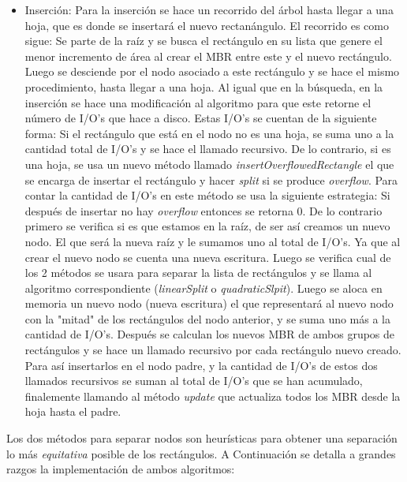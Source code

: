 \documentclass[letterpaper,12pt]{article}
\begin{document}
\begin{itemize}
\item Inserci\'on: Para la inserci\'on se hace un recorrido del \'arbol hasta llegar a una hoja, que es donde se insertar\'a el nuevo rectan\'angulo. El recorrido es como sigue: Se parte de la ra\'iz y se busca el rect\'angulo en su lista que genere el menor incremento de \'area al crear el MBR entre este y el nuevo rect\'angulo. Luego se desciende por el nodo asociado a este rect\'angulo y se hace el mismo procedimiento, hasta llegar a una hoja. Al igual que en la b\'usqueda, en la inserci\'on se hace una modificaci\'on al algoritmo para que este retorne el n\'umero de I/O's que hace a disco. Estas I/O's se cuentan de la siguiente forma: Si el rect\'angulo que est\'a en el nodo no es una hoja, se suma uno a la cantidad total de I/O's y se hace el llamado recursivo. De lo contrario, si es una hoja, se usa un nuevo m\'etodo llamado \textit{insertOverflowedRectangle} el que se encarga de insertar el rect\'angulo y hacer \textit{split} si se produce \textit{overflow}. Para contar la cantidad de I/O's en este m\'etodo se usa la siguiente estrategia: Si despu\'es de insertar no hay \textit{overflow} entonces se retorna 0. De lo contrario primero se verifica si es que estamos en la ra\'iz, de ser as\'i creamos un nuevo nodo. El que ser\'a la nueva ra\'iz y le sumamos uno al total de I/O's. Ya que al crear el nuevo nodo se cuenta una nueva escritura. Luego se verifica cual de los 2 m\'etodos se usara para separar la lista de rect\'angulos y se llama al algoritmo correspondiente (\textit{linearSplit} o \textit{quadraticSlpit}). Luego se aloca en memoria un nuevo nodo (nueva escritura) el que representar\'a al nuevo nodo con la "mitad" de los rect\'angulos del nodo anterior, y se suma uno m\'as a la cantidad de I/O's. Despu\'es se calculan los nuevos MBR de ambos grupos de rect\'angulos y se hace un llamado recursivo por cada rect\'angulo nuevo creado. Para as\'i insertarlos en el nodo padre, y la cantidad de I/O's de estos dos llamados recursivos se suman al total de I/O's que se han acumulado, finalemente llamando al m\'etodo \textit{update} que actualiza todos los MBR desde la hoja hasta el padre.
\end{itemize}
Los dos m\'etodos para separar nodos son heur\'isticas para obtener una separaci\'on lo m\'as \textit{equitativa} posible de los rect\'angulos. A Continuaci\'on se detalla a grandes razgos la implementaci\'on de ambos algoritmos:
\end{document}
